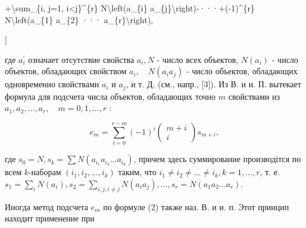 \documentclass[10pt]{article}
\begin{document}
+\textbackslash sum\_\{i, j=1, i<j\}\^{}\{r\} N\textbackslash left(a\_\{i\} a\_\{j\}\textbackslash right)-···+(-1)\^{}\{r\} N\textbackslash left(a\_\{1\} a\_\{2\} ··· a\_\{r\}\textbackslash right),

]



где $a_{i}^{\prime}$ означает отсутствие свойства $a_{i}, N$ - число всех объектов, $N\left(a_{i}\right)$ - число объектов, обладающих свойством $a_{i}, \quad N\left(a_{i} a_{j}\right)$ - число объектов, обладающих одновременно свойствами $a_{i}$ и $a_{j}$, и т. Д. (см., напр., [3]). Из В. и и. П. вытекает формула для подсчета числа объектов, обладающих точно $m$ свойствами из $a_{1}, a_{2}, \ldots, a_{r}, \quad m=0,1, \ldots, r$ :



\[

e_{m}=\sum_{i=0}^{r-m}(-1)^{i}\left(\begin{array}{c}

m+i \\

i

\end{array}\right) s_{m+i},

\]



где $s_{0}=N, s_{k}=\sum N\left(a_{i_{1}} a_{i_{2}} \ldots a_{i_{k}}\right)$, причем здесь суммирование производітся по всем $k$-наборам $\left(i_{1}, i_{2}, \ldots, i_{k}\right)$ таким, что $i_{1} \neq i_{2} \neq \ldots \neq i_{k}, k=1, \ldots, r$, т. е. $s_{1}=\sum_{i} N\left(a_{i}\right), s_{2}=\sum_{i, j, i \neq j} N\left(a_{i} a_{j}\right), \ldots, s_{r}=N\left(a_{1} a_{2} \ldots a_{r}\right)$.



Иногда метод подсчета $e_{m}$ по формуле (2) также наз. В. и и. п. Этот принцип находит применение при
\end{document}
